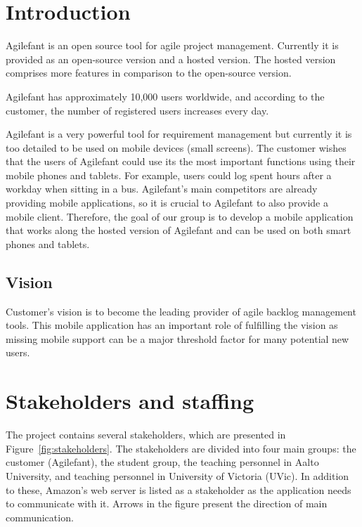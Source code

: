 \section{Introduction}

Agilefant is an open source tool for agile project management. Currently it is
provided as an open-source version and a hosted version. The hosted version
comprises more features in comparison to the open-source version.

Agilefant has approximately 10,000 users worldwide, and according to the
customer, the number of registered users increases every day.
 
Agilefant is a very powerful tool for requirement management but currently it is
too detailed to be used on mobile devices (small screens). The customer wishes
that the users of Agilefant could use its the most important functions using
their mobile phones and tablets. For example, users could log spent hours after
a workday when sitting in a bus. Agilefant's main competitors are already
providing mobile applications, so it is crucial to Agilefant to also provide a
mobile client. Therefore, the goal of our group is to develop a mobile
application that works along the hosted version of Agilefant and can be used on
both smart phones and tablets.

\subsection{Vision}

Customer's vision is to become the leading provider of agile backlog management
tools. This mobile application has an important role of fulfilling the vision as
missing mobile support can be a major threshold factor for many potential
new users.

\section{Stakeholders and staffing}

The project contains several stakeholders, which are presented in
Figure~\ref{fig:stakeholders}. The stakeholders are divided into four main
groups: the customer (Agilefant), the student group, the teaching personnel in
Aalto University, and teaching personnel in University of Victoria (UVic).
In addition to these, Amazon's web server is listed as a stakeholder as the
application needs to communicate with it. Arrows in the figure present the
direction of main communication. 

